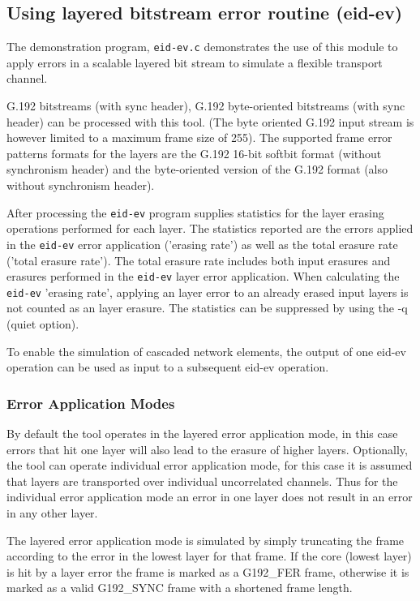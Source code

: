 \subsection {Using layered bitstream error routine (eid-ev)}


The demonstration program, \texttt{eid-ev.c} demonstrates the use of this 
module to apply errors in a scalable layered bit stream to simulate a 
flexible transport channel. 

G.192 bitstreams (with sync header), G.192 byte-oriented bitstreams
(with sync header) can be processed with this tool. (The byte oriented
G.192 input stream is however limited to a maximum frame size of
255). The supported frame error patterns formats for the layers are
the G.192 16-bit softbit format (without synchronism header) and the
byte-oriented version of the G.192 format (also without synchronism
header).

After processing the \texttt{eid-ev} program supplies statistics for the 
layer erasing operations performed for each layer. The statistics 
reported are the errors applied in the \texttt{eid-ev} error application 
('erasing rate') as well as the total erasure rate ('total erasure rate'). 
The total erasure rate includes both input erasures and erasures performed 
in the \texttt{eid-ev} layer error application. When calculating the 
\texttt{eid-ev} 'erasing rate', applying an layer error to an already erased 
input layers is not counted as an layer erasure. The statistics can be 
suppressed by using the -q (quiet option).
 
To enable the simulation of cascaded network elements, the output of one 
eid-ev operation can be used as input to a subsequent eid-ev operation.

\subsubsection{Error Application Modes}
By default the tool operates in the layered error application mode, in
this case errors that hit one layer will also lead to the erasure of
higher layers. Optionally, the tool can operate individual error
application mode, for this case it is assumed that layers are
transported over individual uncorrelated channels. Thus for the
individual error application mode an error in one layer does not
result in an error in any other layer.

The layered error application mode is simulated by simply truncating
the frame according to the error in the lowest layer for that frame.
If the core (lowest layer) is hit by a layer error the frame is marked
as a G192\_FER frame, otherwise it is marked as a valid G192\_SYNC
frame with a shortened frame length.

